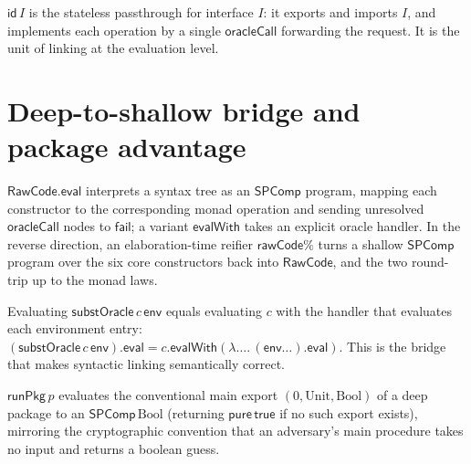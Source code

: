 \begin{definition}
  \label{def:deeppackage-id}
  \leanok
  $\mathsf{id}\,I$ is the stateless passthrough for interface $I$: it exports
  and imports $I$, and implements each operation by a single
  $\mathsf{oracleCall}$ forwarding the request. It is the unit of linking at the
  evaluation level.
\end{definition}

\section{Deep-to-shallow bridge and package advantage}

\begin{definition}
  \label{def:eval}
  \leanok
  $\mathsf{RawCode.eval}$ interprets a syntax tree as an $\mathsf{SPComp}$
  program, mapping each constructor to the corresponding monad operation and
  sending unresolved $\mathsf{oracleCall}$ nodes to $\mathsf{fail}$; a variant
  $\mathsf{evalWith}$ takes an explicit oracle handler. In the reverse
  direction, an elaboration-time reifier $\mathsf{rawCode\%}$ turns a shallow
  $\mathsf{SPComp}$ program over the six core constructors back into
  $\mathsf{RawCode}$, and the two round-trip up to the monad laws.
\end{definition}

\begin{lemma}
  \label{lem:eval-substoracle}
  \leanok
  Evaluating $\mathsf{substOracle}\,c\,\mathsf{env}$ equals evaluating $c$ with
  the handler that evaluates each environment entry:
  $(\mathsf{substOracle}\,c\,\mathsf{env}).\mathsf{eval} =
  c.\mathsf{evalWith}(\lambda\ldots.\,(\mathsf{env}\ldots).\mathsf{eval})$. This
  is the bridge that makes syntactic linking semantically correct.
\end{lemma}

\begin{definition}
  \label{def:runpkg}
  \leanok
  $\mathsf{runPkg}\,p$ evaluates the conventional main export
  $(0, \mathrm{Unit}, \mathrm{Bool})$ of a deep package to an
  $\mathsf{SPComp}\,\mathrm{Bool}$ (returning $\mathsf{pure}\,\mathsf{true}$ if
  no such export exists), mirroring the cryptographic convention that an
  adversary's main procedure takes no input and returns a boolean guess.
\end{definition}


